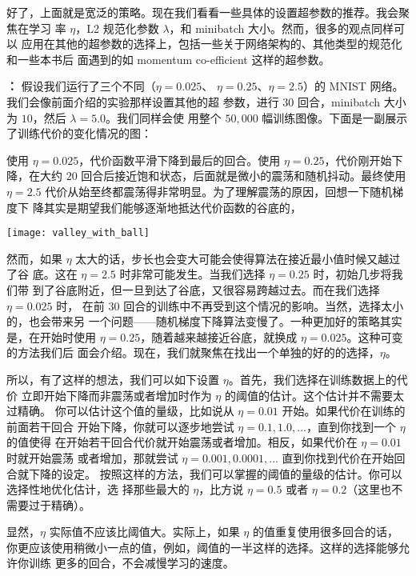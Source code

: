 好了，上面就是宽泛的策略。现在我们看看一些具体的设置超参数的推荐。我会聚焦在学习
率 $\eta$，L2 规范化参数 $\lambda$，和 minibatch 大小。然而，很多的观点同样可以
应用在其他的超参数的选择上，包括一些关于网络架构的、其他类型的规范化和一些本书后
面遇到的如 momentum co-efficient 这样的超参数。

\textbf{\learningrate{}：} 假设我们运行了三个不同\learningrate{}（$\eta=0.025$、
  $\eta=0.25$、$\eta=2.5$）的 MNIST 网络。我们会像前面介绍的实验那样设置其他的超
参数，进行 $30$ 回合，minibatch 大小为 $10$，然后 $\lambda = 5.0$。我们同样会使
用整个 $50,000$ 幅训练图像。下面是一副展示了训练代价的变化情况的图：

使用 $\eta=0.025$，代价函数平滑下降到最后的回合。使用 $\eta=0.25$，代价刚开始下
降，在大约 $20$ 回合后接近饱和状态，后面就是微小的震荡和随机抖动。最终使用
$\eta=2.5$ 代价从始至终都震荡得非常明显。为了理解震荡的原因，回想一下随机梯度下
降其实是期望我们能够逐渐地抵达代价函数的谷底的，
\begin{center}
  \texttt{[image: valley\_with\_ball]}
\end{center}

然而，如果 $\eta$ 太大的话，步长也会变大可能会使得算法在接近最小值时候又越过了谷
底。这在 $\eta=2.5$ 时非常可能发生。当我们选择 $\eta=0.25$ 时，初始几步将我们带
到了谷底附近，但一旦到达了谷底，又很容易跨越过去。而在我们选择 $\eta=0.025$ 时，
在前 $30$ 回合的训练中不再受到这个情况的影响。当然，选择太小的\learningrate{}，也会带来另
一个问题——随机梯度下降算法变慢了。一种更加好的策略其实是，在开始时使用
$\eta=0.25$，随着越来越接近谷底，就换成 $\eta=0.025$。这种可变\learningrate{}的方法我们后
面会介绍。现在，我们就聚焦在找出一个单独的好的\learningrate{}的选择，$\eta$。

所以，有了这样的想法，我们可以如下设置 $\eta$。首先，我们选择在训练数据上的代价
立即开始下降而非震荡或者增加时作为 $\eta$ 的阈值的估计。这个估计并不需要太过精确。
你可以估计这个值的量级，比如说从 $\eta=0.01$ 开始。如果代价在训练的前面若干回合
开始下降，你就可以逐步地尝试 $\eta=0.1, 1.0,...$，直到你找到一个 $\eta$ 的值使得
在开始若干回合代价就开始震荡或者增加。相反，如果代价在 $\eta=0.01$ 时就开始震荡
或者增加，那就尝试 $\eta=0.001, 0.0001,...$ 直到你找到代价在开始回合就下降的设定。
按照这样的方法，我们可以掌握\learningrate{}的阈值的量级的估计。你可以选择性地优化估计，选
择那些最大的 $\eta$，比方说 $\eta=0.5$ 或者 $\eta=0.2$（这里也不需要过于精确）。

显然，$\eta$ 实际值不应该比阈值大。实际上，如果 $\eta$ 的值重复使用很多回合的话，
你更应该使用稍微小一点的值，例如，阈值的一半这样的选择。这样的选择能够允许你训练
更多的回合，不会减慢学习的速度。


